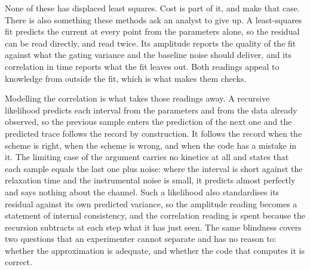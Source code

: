 None of these has displaced least squares. Cost is part of it, and \citet{delcore2025parameter} make
that case. There is also something these methods ask an analyst to give up. A least-squares fit
predicts the current at every point from the parameters alone, so the residual can be read directly,
and read twice. Its amplitude reports the quality of the fit against what the gating variance and the
baseline noise should deliver, and its correlation in time reports what the fit leaves out. Both
readings appeal to knowledge from outside the fit, which is what makes them checks.

Modelling the correlation is what takes those readings away. A recursive likelihood predicts each
interval from the parameters and from the data already observed, so the previous sample enters the
prediction of the next one and the predicted trace follows the record by construction. It follows the
record when the scheme is right, when the scheme is wrong, and when the code has a mistake in it. The
limiting case of the argument carries no kinetics at all and states that each sample equals the last
one plus noise: where the interval is short against the relaxation time and the instrumental noise is
small, it predicts almost perfectly and says nothing about the channel. %
Such a likelihood also standardises its residual against its own predicted variance, so the amplitude
reading becomes a statement of internal consistency, and the correlation reading is spent because the
recursion subtracts at each step what it has just seen. The same blindness covers two questions that
an experimenter cannot separate and has no reason to: whether the approximation is adequate, and
whether the code that computes it is correct.

